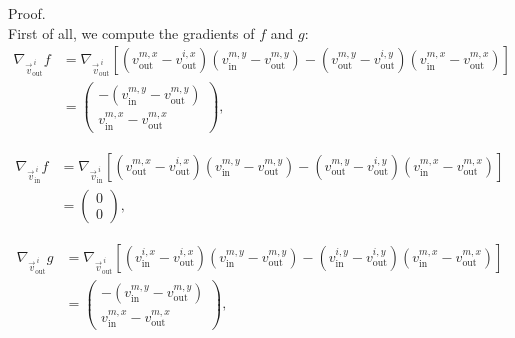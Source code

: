\begin{proposition}
	Proof.\\

	First of all, we compute the gradients of $f$ and $g$: 
	\begin{align*}
		\nabla_{\vec{v}_{\text{out}}^{\: i}} f 
		&= \nabla_{\vec{v}_{\text{out}}^{\: i}}[(v_{\text{out}}^{m, x} - v_{\text{out}}^{i, x})(v_{\text{in}}^{m, y} - v_{\text{out}}^{m, y}) - (v_{\text{out}}^{m, y} - v_{\text{out}}^{i, y})(v_{\text{in}}^{m, x} - v_{\text{out}}^{m, x})] \\[0.5em]
		&= \begin{pmatrix}
			-(v_{\text{in}}^{m, y} - v_{\text{out}}^{m, y}) \\[0.5em]
			 v_{\text{in}}^{m, x} - v_{\text{out}}^{m, x}
		\end{pmatrix}, 
	\end{align*}

	\begin{align*}
		\nabla_{\vec{v}_{\text{in}}^{\: i}} f 
		&= \nabla_{\vec{v}_{\text{in}}^{\: i}}[(v_{\text{out}}^{m, x} - v_{\text{out}}^{i, x})(v_{\text{in}}^{m, y} - v_{\text{out}}^{m, y}) - (v_{\text{out}}^{m, y} - v_{\text{out}}^{i, y})(v_{\text{in}}^{m, x} - v_{\text{out}}^{m, x})] \\[0.5em]
		&= \begin{pmatrix}
			0 \\
			0
		\end{pmatrix}, 
	\end{align*}

	\begin{align*}
		\nabla_{\vec{v}_{\text{out}}^{\: i}} g
		&= \nabla_{\vec{v}_{\text{out}}^{\: i}}[(v_{\text{in}}^{i, x} - v_{\text{out}}^{i, x})(v_{\text{in}}^{m, y} - v_{\text{out}}^{m, y}) - (v_{\text{in}}^{i, y} - v_{\text{out}}^{i, y})(v_{\text{in}}^{m, x} - v_{\text{out}}^{m, x})] \\[0.5em]
		&= \begin{pmatrix}
			-(v_{\text{in}}^{m, y} - v_{\text{out}}^{m, y}) \\[0.5em]
			 v_{\text{in}}^{m, x} - v_{\text{out}}^{m, x}
		\end{pmatrix}, 
	\end{align*}


\end{proposition}
